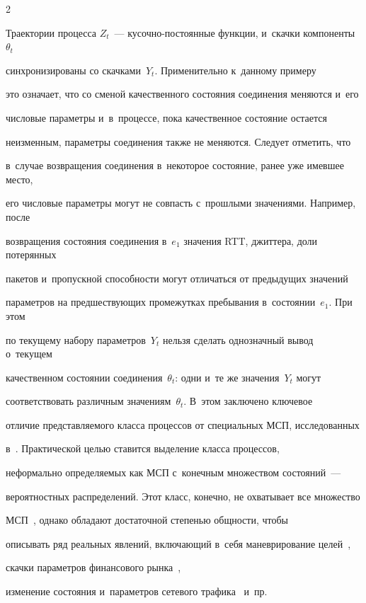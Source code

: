 \begin{multicols}{2}
\begin{itemize}
\end{itemize}


Траектории процесса $Z_t$~--- ку\-соч\-но-по\-сто\-ян\-ные функции, и~скачки компоненты~$\theta_t$ 


синхронизированы со скачками~$Y_t$. Применительно к~данному примеру 


это означает, что со сменой качественного состояния соединения меняются и~его 


числовые параметры и~в~процессе, пока качественное состояние остается 


неизменным, параметры соединения также не меняются. Следует отметить, что 


в~случае возвращения соединения в~некоторое состояние, ранее уже имевшее место, 


его чис\-ло\-вые па\-ра\-мет\-ры могут не совпасть с~прошлыми значениями. Например, после 


возвращения состояния соединения в~$e_1$ значения RTT, джиттера, доли потерянных 


пакетов и~пропускной способности могут отличаться от предыдущих значений 


параметров на предшествующих промежутках пребывания в~состоянии~$e_1$. При этом 


по текущему набору па\-ра\-мет\-ров~$Y_t$ \mbox{нельзя} сделать однозначный вывод о~текущем 


качественном состоянии соединения~$\theta_t$: одни и~те же значения~$Y_t$ могут 


соответствовать различным значениям~$\theta_t$. В~этом заключено ключевое 


отличие представляемого класса процессов от специальных МСП, исследованных 


в~\cite{B_04_1}. Практической целью ставится выделение класса процессов, 


неформально определяемых как МСП с~конечным множеством состояний~--- 


вероятностных распределений. Этот класс, конечно, не охватывает все множество 


МСП~\cite{D_63, GS_73_2}, однако обладают достаточной степенью общности, чтобы 


описывать ряд реальных явлений, включающий в~себя маневрирование целей~\cite{LJ_05}, 


скачки параметров финансового рынка~\cite{mamon2014hidden}, 


изменение состояния и~параметров сетевого трафика~\cite{DPR_08} и~пр.






\end{multicols}

